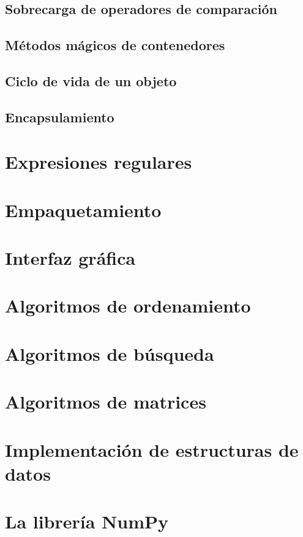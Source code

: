 \documentclass{article}
\begin{document}
\subsection{Sobrecarga de operadores de comparación}

\subsection{Métodos mágicos de contenedores}

\subsection{Ciclo de vida de un objeto}

\subsection{Encapsulamiento}

\section{Expresiones regulares}

\section{Empaquetamiento}

\section{Interfaz gráfica}

\section{Algoritmos de ordenamiento}

\section{Algoritmos de búsqueda}

\section{Algoritmos de matrices}

\section{Implementación de estructuras de datos}

\section{La librería NumPy}
\end{document}
